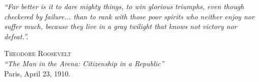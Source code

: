 

\begin{epigrafe} %

  \textit{\large ``Far better is it to dare mighty things, to win glorious
    triumphs, even though checkered by failure... than to rank with those poor
    spirits who neither enjoy nor suffer much, because they live in a gray
    twilight that knows not victory nor defeat.''.}

\vspace*{1cm}

\hfill%
\begin{minipage}[r]{.6\linewidth}
  \begin{center}
    \textsc{Theodore Roosevelt}\\
    \textsl{``The Man in the Arena: Citizenship in a Republic''}\\
    Paris, April 23, 1910.
  \end{center}
\end{minipage}

\end{epigrafe}

